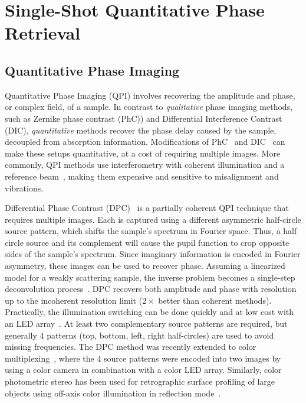 \chapter{Single-Shot Quantitative Phase Retrieval}

\section{Quantitative Phase Imaging}
Quantitative Phase Imaging (QPI) involves recovering the amplitude and phase, or complex field, of a sample. In contrast to \emph{qualitative} phase imaging methods, such as Zernike phase contrast (PhC)\cite{zernike1955discovered}) and Differential Interference Contrast (DIC)\cite{smithDIC}, \emph{quantitative} methods recover the phase delay caused by the sample, decoupled from absorption information. Modifications of PhC~\cite{yun2010system} and DIC~\cite{CuiYangTearney2011} can make these setups quantitative, at a cost of requiring multiple images. More commonly, QPI methods use interferometry with coherent illumination and a reference beam~\cite{Popescu:06,Wang:11,Bhaduri:12}, making them expensive and sensitive to misalignment and vibrations.

Differential Phase Contrast (DPC)~\cite{Hamilton1984a,mehta2009quantitative,Tian14,tian2015quantitative} is a partially coherent QPI technique that requires multiple images. Each is captured using a different asymmetric half-circle source pattern, which shifts the sample's spectrum in Fourier space. Thus, a half circle source and its complement will cause the pupil function to crop opposite sides of the sample's spectrum. Since imaginary information is encoded in Fourier asymmetry, these images can be used to recover phase. Assuming a linearized model for a weakly scattering sample, the inverse problem becomes a single-step deconvolution process~\cite{mehta2009quantitative,tian2015quantitative}. DPC recovers both amplitude and phase with resolution up to the incoherent resolution limit ($2\times$ better than coherent methods). Practically, the illumination switching can be done quickly and at low cost with an LED array~\cite{Tian14,zijiMulti,tian2015quantitative}. At least two complementary source patterns are required, but generally 4 patterns (top, bottom, left, right half-circles) are used to avoid missing frequencies. The DPC method was recently extended to color multiplexing~\cite{lee2015color}, where the 4 source patterns were encoded into two images by using a color camera in combination with a color LED array. Similarly, color photometric stereo has been used for retrographic surface profiling of large objects using off-axis color illumination in reflection mode~\cite{johnson2009retrographic}.

